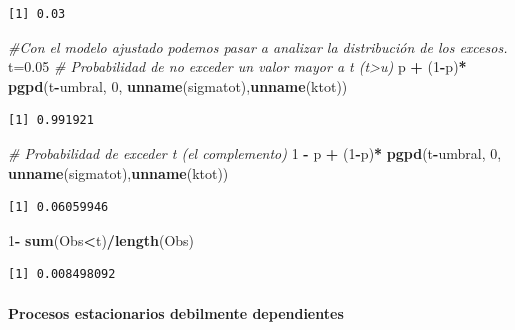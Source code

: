 \documentclass[
  12pt]{article}
\newenvironment{Shaded}{\begin{snugshade}}{\end{snugshade}}
\newcommand{\CommentTok}[1]{\textcolor[rgb]{0.56,0.35,0.01}{\textit{#1}}}
\newcommand{\DecValTok}[1]{\textcolor[rgb]{0.00,0.00,0.81}{#1}}
\newcommand{\FloatTok}[1]{\textcolor[rgb]{0.00,0.00,0.81}{#1}}
\newcommand{\FunctionTok}[1]{\textcolor[rgb]{0.13,0.29,0.53}{\textbf{#1}}}
\newcommand{\NormalTok}[1]{#1}
\newcommand{\OtherTok}[1]{\textcolor[rgb]{0.56,0.35,0.01}{#1}}
\newcommand{\SpecialCharTok}[1]{\textcolor[rgb]{0.81,0.36,0.00}{\textbf{#1}}}
\begin{document}
\begin{verbatim}
[1] 0.03
\end{verbatim}

\begin{Shaded}
\begin{Highlighting}[]
\CommentTok{\#Con el modelo ajustado podemos pasar a analizar la distribución de los excesos.}
\NormalTok{t}\OtherTok{=}\FloatTok{0.05}
\CommentTok{\# Probabilidad de no exceder un valor mayor a t (t\textgreater{}u)}
\NormalTok{p }\SpecialCharTok{+}\NormalTok{ (}\DecValTok{1}\SpecialCharTok{{-}}\NormalTok{p)}\SpecialCharTok{*} \FunctionTok{pgpd}\NormalTok{(t}\SpecialCharTok{{-}}\NormalTok{umbral, }\DecValTok{0}\NormalTok{, }\FunctionTok{unname}\NormalTok{(sigmatot),}\FunctionTok{unname}\NormalTok{(ktot))}
\end{Highlighting}
\end{Shaded}

\begin{verbatim}
[1] 0.991921
\end{verbatim}

\begin{Shaded}
\begin{Highlighting}[]
\CommentTok{\# Probabilidad de exceder t (el complemento)}
\DecValTok{1} \SpecialCharTok{{-}}\NormalTok{ p }\SpecialCharTok{+}\NormalTok{ (}\DecValTok{1}\SpecialCharTok{{-}}\NormalTok{p)}\SpecialCharTok{*} \FunctionTok{pgpd}\NormalTok{(t}\SpecialCharTok{{-}}\NormalTok{umbral, }\DecValTok{0}\NormalTok{, }\FunctionTok{unname}\NormalTok{(sigmatot),}\FunctionTok{unname}\NormalTok{(ktot))}
\end{Highlighting}
\end{Shaded}

\begin{verbatim}
[1] 0.06059946
\end{verbatim}

\begin{Shaded}
\begin{Highlighting}[]
\DecValTok{1}\SpecialCharTok{{-}} \FunctionTok{sum}\NormalTok{(Obs}\SpecialCharTok{\textless{}}\NormalTok{t)}\SpecialCharTok{/}\FunctionTok{length}\NormalTok{(Obs)}
\end{Highlighting}
\end{Shaded}

\begin{verbatim}
[1] 0.008498092
\end{verbatim}

\paragraph{Procesos estacionarios debilmente
dependientes}\label{procesos-estacionarios-debilmente-dependientes}
\end{document}
